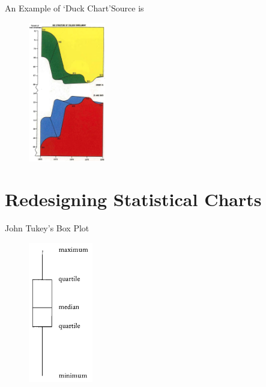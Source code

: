 \documentclass[aspectratio=1610]{beamer}
\begin{document}
\begin{frame}{An Example of `Duck Chart'}{Source is \cite[][page 118]{tufte2001}}
	\begin{figure}
		\begin{center}
			\includegraphics[width=0.3\textwidth]{images/a_duck_chart.png}
		\end{center}
	\end{figure}
\end{frame}

\section{Redesigning Statistical Charts}

\begin{frame}{John Tukey's Box Plot}{}
	\begin{figure}
		\begin{center}
			\includegraphics[width=0.25\textwidth]{images/boxplot.png}
		\end{center}
	\end{figure}
\end{frame}
\end{document}
